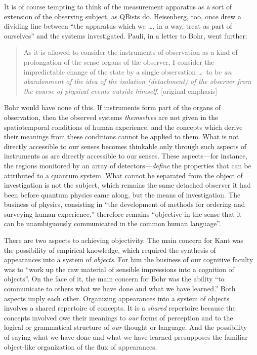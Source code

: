\documentclass[smallextended]{svjour3}
\newcommand{\bq}{\begin{quote}}
\newcommand{\eq}{\end{quote}}
\begin{document}
It is of course tempting to think of the {measurement apparatus} as a sort of extension of the observing subject, as QBists do. Heisenberg,\cite{Heisenberg1935} too, once drew a dividing line between ``the apparatus which we \dots, in a way, treat as part of ourselves'' and the systems investigated. Pauli,\cite{Pauli1955} in a letter to Bohr, went further: 
\bq
As it is allowed to consider the instruments of observation as a kind of prolongation of the sense organs of the {observer}, I consider the impredictable change of the state by a single observation \dots\ to be \emph{an abandonment of the idea of the isolation (detachment) of the observer from the course of physical events outside himself}. [original emphasis]
\eq
Bohr would have none of this. If instruments form part of the organs of observation, then the observed systems \emph{themselves} are not given in the spatiotemporal conditions of human experience, and the concepts which derive their meanings from these conditions cannot be applied to them. What is not directly accessible to our senses becomes thinkable only through such aspects of instruments as are directly accessible to our senses. These aspects---for instance, the regions monitored by an array of detectors---\emph{define} the properties that can be attributed to a quantum system. What cannot be separated from the object of investigation is not the subject, which remains the same detached observer it had been before quantum physics came along, but the means of investigation. The business of physics, consisting in ``the development of methods for ordering and surveying human {experience},'' therefore remains ``objective in the sense that it can be unambiguously communicated in the common human language''.\cite{BohrE58-62}

There are two aspects to achieving objectivity. The main concern for Kant was the possibility of empirical knowledge, which required the synthesis of appearances into a system of \emph{objects}. For him the business of our cognitive faculty was to ``work up the raw material of sensible impressions into a cognition of objects''.\cite{KantCPR5} On the face of it, the main concern for Bohr was the ability ``to communicate to others what we have done and what we have learned.'' Both aspects imply each other. Organizing appearances into a system of objects involves a shared repertoire of concepts. It is a \emph{shared} repertoire because the concepts involved owe their meanings to \emph{our} forms of perception and to the logical or grammatical structure of \emph{our} thought or language. And the possibility of saying what we have done and what we have learned presupposes the familiar object-like organization of the flux of appearances.
\end{document}
